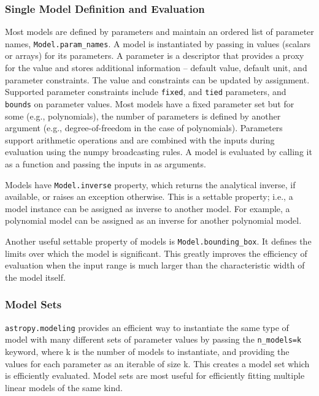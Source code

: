 \documentclass[modern]{aastex61}
\newcommand{\package}[1]{\texttt{#1}\xspace}
\begin{document}
\subsubsection{Single Model Definition and Evaluation}
Most models are defined by parameters and maintain an ordered list of parameter names, \texttt{Model.param\_names}. A model is instantiated by passing in values (scalars or arrays) for its parameters. A parameter is a descriptor that provides a proxy for the value and stores additional information -- default value, default unit, and parameter constraints. The value and constraints can be updated by assignment. Supported parameter constraints include \texttt{fixed}, and \texttt{tied} parameters, and \texttt{bounds} on parameter values. Most models have a fixed parameter set but for some (e.g., polynomials), the number of parameters is defined by another argument (e.g., degree-of-freedom in the case of polynomials). Parameters support arithmetic operations and are combined with the inputs during evaluation using the numpy broadcasting rules. A model is evaluated by calling it as a function and passing the inputs in as arguments. 

Models have \texttt{Model.inverse} property, which returns the analytical inverse, if available, or raises an exception otherwise. This is a settable property; i.e., a model instance can be assigned as inverse to another model. For example, a polynomial model can be assigned as an inverse for another polynomial model.

Another useful settable property of models is \texttt{Model.bounding\_box}. It defines the limits over which the model is significant. This greatly improves the efficiency of evaluation when the input range is much larger than the characteristic width of the model itself.

\subsubsection{Model Sets}

\package{astropy.modeling} provides an efficient way to instantiate the same type of model with many different sets of parameter values by passing the \texttt{n\_models=k} keyword, where k is the number of models to instantiate, and providing the values for each parameter as an iterable of size k. This creates a model set which is efficiently evaluated. Model sets are most useful for efficiently fitting multiple linear models of the same kind.
\end{document}
